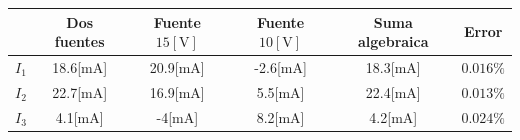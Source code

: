 \documentclass[letter,11pt]{article}
\begin{document}
\begin{center}
\begin{tabular}{|c||c||c|c|c||c|}
\hline
& \textbf{Dos fuentes} &
    \textbf{Fuente $15[\text{V}]$} &
    \textbf{Fuente $10[\text{V}]$} &
    \textbf{Suma algebraica} &
    \textbf{Error}
\tabularnewline \hline \hline
$I_1$ & 18.6[mA] & 20.9[mA] & -2.6[mA] & 18.3[mA] & $0.016\%$
\tabularnewline \hline
$I_2$ & 22.7[mA] & 16.9[mA] & 5.5[mA] & 22.4[mA] & $0.013\%$
\tabularnewline \hline
$I_3$ & 4.1[mA] & -4[mA] & 8.2[mA] & 4.2[mA] & $0.024\%$
\tabularnewline \hline
\end{tabular}
\end{center}
\end{document}
